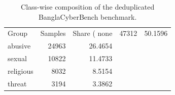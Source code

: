 \begin{table}
\caption{Class-wise composition of the deduplicated BanglaCyberBench benchmark.}
\label{tab:dataset_class_composition}
\begin{tabular}{lrr}
\toprule
Group & Samples & Share (%
\midrule
none & 47312 & 50.1596 \\
abusive & 24963 & 26.4654 \\
sexual & 10822 & 11.4733 \\
religious & 8032 & 8.5154 \\
threat & 3194 & 3.3862 \\
\bottomrule
\end{tabular}
\end{table}

